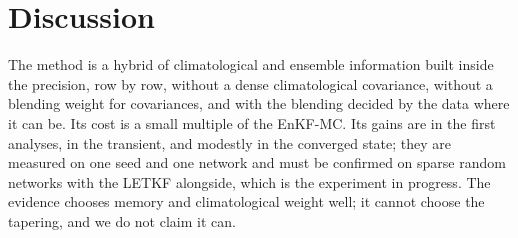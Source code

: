 \documentclass[11pt]{article}
\begin{document}
\section{Discussion}\label{sec:discussion}
The method is a hybrid of climatological and ensemble information built inside the
precision, row by row, without a dense climatological covariance, without a blending
weight for covariances, and with the blending decided by the data where it can be. Its
cost is a small multiple of the EnKF-MC. Its gains are in the first analyses, in the
transient, and modestly in the converged state; they are measured on one seed and one
network and must be confirmed on sparse random networks with the LETKF alongside,
which is the experiment in progress. The evidence chooses memory and climatological
weight well; it cannot choose the tapering, and we do not claim it can.
\end{document}
